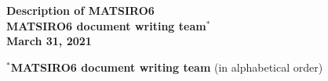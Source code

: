 \documentclass[11pt,a4paper,onecolumn]{article}
\begin{document}
%
\begin{titlepage} %
	\vspace*{\fill}
		\begin{center}
			{\Huge \textbf{Description of MATSIRO6}}\\
			\vspace{100mm}
			{\Large \textbf{MATSIRO6 document writing team$^*$}}\\
			\vspace{30mm}
			{\Large \textbf{March 31, 2021}}
		\end{center}
	\vspace*{\fill}
	$^*${\bf\textbf{MATSIRO6 document writing team}} (in alphabetical order)
	
\end{titlepage}
%
\clearpage

\clearpage

	\tableofcontents
	\clearpage
	\def\tightlist{\itemsep1pt\parskip0pt\parsep0pt}
	
\end{document}
